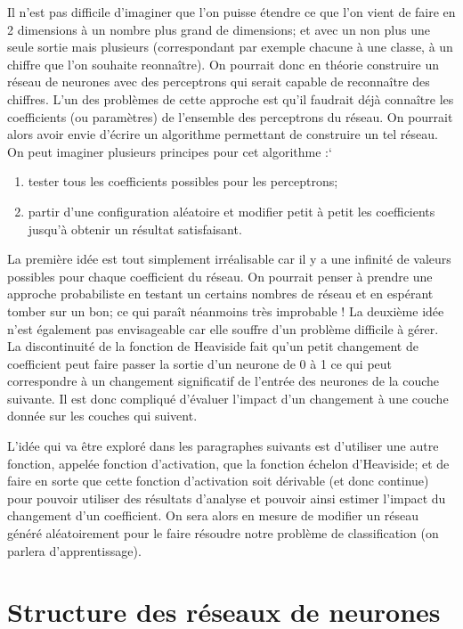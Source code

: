 Il n'est pas difficile d'imaginer que l'on puisse étendre ce que l'on vient de faire en 
2 dimensions à un nombre plus grand de dimensions; et avec un non plus une seule sortie 
mais plusieurs (correspondant par exemple chacune à une classe, à un chiffre que l'on 
souhaite reonnaître).
On pourrait donc en théorie construire un réseau de neurones avec des perceptrons 
qui serait capable de reconnaître des chiffres. 
L'un des problèmes de cette approche est qu'il faudrait déjà connaître les coefficients 
(ou paramètres) de l'ensemble des perceptrons du réseau.
On pourrait alors avoir envie d'écrire un algorithme permettant de construire un tel 
réseau. On peut imaginer plusieurs principes pour cet algorithme :`
\begin{enumerate}
  \item tester tous les coefficients possibles pour les perceptrons;
  \item partir d'une configuration aléatoire et modifier petit à petit les coefficients 
        jusqu'à obtenir un résultat satisfaisant.
\end{enumerate}

La première idée est tout simplement irréalisable car il y a une infinité de valeurs 
possibles pour chaque coefficient du réseau. On pourrait penser à prendre une 
approche probabiliste en testant un certains nombres de réseau et en espérant tomber sur 
un bon; ce qui paraît néanmoins très improbable ! 
La deuxième idée n'est également pas envisageable car elle souffre d'un problème difficile 
à gérer. La discontinuité de la fonction de Heaviside fait qu'un petit changement de coefficient 
peut faire passer la sortie d'un neurone de 0 à 1 ce qui peut correspondre à un changement 
significatif de l'entrée des neurones de la couche suivante. Il est donc compliqué d'évaluer 
l'impact d'un changement à une couche donnée sur les couches qui suivent.

L'idée qui va être exploré dans les paragraphes suivants est d'utiliser une autre fonction, 
appelée fonction d'activation, que la fonction échelon d'Heaviside; et de faire en sorte que 
cette fonction d'activation soit dérivable (et donc continue) pour pouvoir utiliser des 
résultats d'analyse et pouvoir ainsi estimer l'impact du changement d'un coefficient.
On sera alors en mesure de modifier un réseau généré aléatoirement pour le faire résoudre 
notre problème de classification (on parlera d'apprentissage).



\section{Structure des réseaux de neurones}



